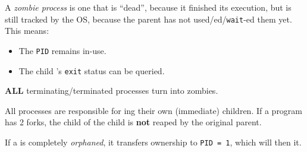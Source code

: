 \begin{definition}\label{def:Zombie_Process}
  A \emph{zombie process} is one that is ``dead'', because it finished its execution, but is still tracked by the OS, because the parent has not used/ed/\texttt{wait}-ed them yet.\@
  This means:
  \begin{itemize}[noitemsep]
  \item The \texttt{PID} remains in-use.
  \item The child 's \texttt{exit} status can be queried.
   \end{itemize}

   \textbf{ALL} terminating/terminated processes turn into zombies.

   \begin{remark}\label{rmk:Process_Responsible_Reaping}
     All processes are responsible for ing their own (immediate) children.
     If a program has 2 forks, the child of the child is \textbf{not} reaped by the original parent.
   \end{remark}

   \begin{remark}\label{rmk:Orphaned_Process}
    If a  is completely \emph{orphaned}, it transfers ownership to \texttt{PID = 1}, which will then  it.
  \end{remark}
\end{definition}


